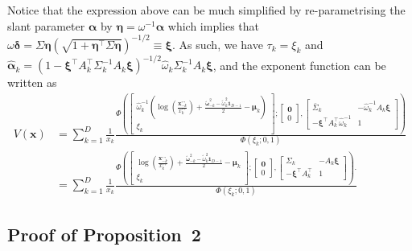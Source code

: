 \documentclass[lineno]{biometrika}
\begin{document}
Notice that the expression above can be much simplified by re-parametrising the slant parameter $\bm \alpha$ by $\bm \eta = \omega^{-1}\bm\alpha$ which implies that $\omega \bm \delta = \Sigma\bm\eta\left(\sqrt{1+\bm\eta^\top\Sigma\bm\eta}\right)^{-1/2} \equiv \bm\xi$. As such, we have $\tau_k = \xi_k$ and $\hat{\bm\alpha}_k = \left(1-\bm\xi^\top A_k^\top\Sigma_k^{-1} A_k \bm\xi \right)^{-1/2} \hat{ \omega}_k\Sigma_k^{-1}A_k \bm\xi$, and the exponent function can be written as
%
\begin{align*}
V(\bm x) &= \sum_{k=1}^D \frac{1}{x_k} 
\frac{\Phi \left(
    \begin{bmatrix} 
        \hat{\omega}_k^{-1}\left( \log \left( \frac{\bm x^{\circ\circ}_{-k}}{x^{\circ\circ}_k} \right) + \frac{\tilde{\bm \omega}_{-k}^2 - \tilde{\omega}_k^2\bm 1_{D-1}}{2} - \bm \mu_k\right)  \\
        \xi_k
    \end{bmatrix};
    \begin{bmatrix} 
    \bm 0 \\ 0
    \end{bmatrix},
    \begin{bmatrix}
        \bar\Sigma_k & - \hat{\omega}_k^{-1} A_k \bm \xi  \\
       - \bm \xi^\top A_k^\top \hat{\omega}_k^{-1} &	1
    \end{bmatrix} \right)
    }
    {\Phi\left(\xi_k; 0, 1\right)} \\
 &= \sum_{k=1}^D \frac{1}{x_k} 
\frac{\Phi \left(
    \begin{bmatrix} 
        \log \left( \frac{\bm x^{\circ\circ}_{-k}}{x^{\circ\circ}_k} \right) + \frac{\tilde{\bm \omega}_{-k}^2 - \tilde{\omega}_k^2\bm 1_{D-1}}{2} - \bm \mu_k  \\
        \xi_k
    \end{bmatrix};
    \begin{bmatrix} 
    \bm 0 \\ 0
    \end{bmatrix},
    \begin{bmatrix}
        \Sigma_k & - A_k \bm \xi  \\
       - \bm \xi^\top A_k^\top &	1
    \end{bmatrix} \right).
    }
    {\Phi\left(\xi_k; 0, 1\right)}   
\end{align*}
%


\subsection{Proof of Proposition~2}
\end{document}
